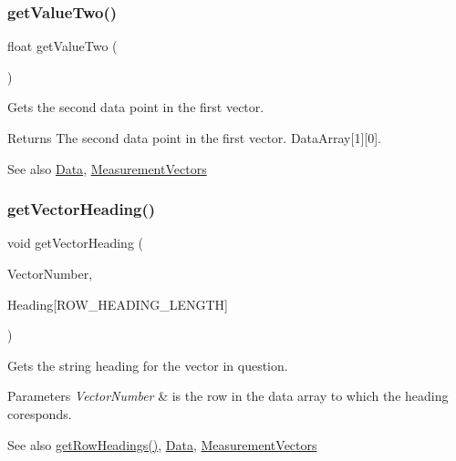\subsubsection{\texorpdfstring{getValueTwo()}{getValueTwo()}}
{\footnotesize\ttfamily float get\+Value\+Two (\begin{DoxyParamCaption}\item[{void}]{ }\end{DoxyParamCaption})}



Gets the second data point in the first vector. 

\begin{DoxyReturn}{Returns}
The second data point in the first vector. Data\+Array\mbox{[}1\mbox{]}\mbox{[}0\mbox{]}. 
\end{DoxyReturn}
\begin{DoxySeeAlso}{See also}
\mbox{\hyperlink{struct_data}{Data}}, \mbox{\hyperlink{_s_p_i___instruction_set_8h_a9d8048399836e11887f85cc8dc3d75d5}{Measurement\+Vectors}} 
\end{DoxySeeAlso}
\mbox{\label{class_data_source_a79d69573a651290750aa8c08d24f3b64}} 
\subsubsection{\texorpdfstring{getVectorHeading()}{getVectorHeading()}}
{\footnotesize\ttfamily void get\+Vector\+Heading (\begin{DoxyParamCaption}\item[{const \mbox{\hyperlink{_s_p_i___instruction_set_8h_a9d8048399836e11887f85cc8dc3d75d5}{Measurement\+Vectors}}}]{Vector\+Number,  }\item[{char}]{Heading\mbox{[}\+R\+O\+W\+\_\+\+H\+E\+A\+D\+I\+N\+G\+\_\+\+L\+E\+N\+G\+T\+H\mbox{]} }\end{DoxyParamCaption})}



Gets the string heading for the vector in question. 


\begin{DoxyParams}{Parameters}
{\em Vector\+Number} & is the row in the data array to which the heading coresponds. \\
\hline
\end{DoxyParams}
\begin{DoxySeeAlso}{See also}
\mbox{\hyperlink{class_data_source_acdeb2ae03f2c70d19565381d111a1a4d}{get\+Row\+Headings()}}, \mbox{\hyperlink{struct_data}{Data}}, \mbox{\hyperlink{_s_p_i___instruction_set_8h_a9d8048399836e11887f85cc8dc3d75d5}{Measurement\+Vectors}} 
\end{DoxySeeAlso}
\mbox{\label{class_data_source_a49998f22c00d924daf7b67af48e10a30}} 
